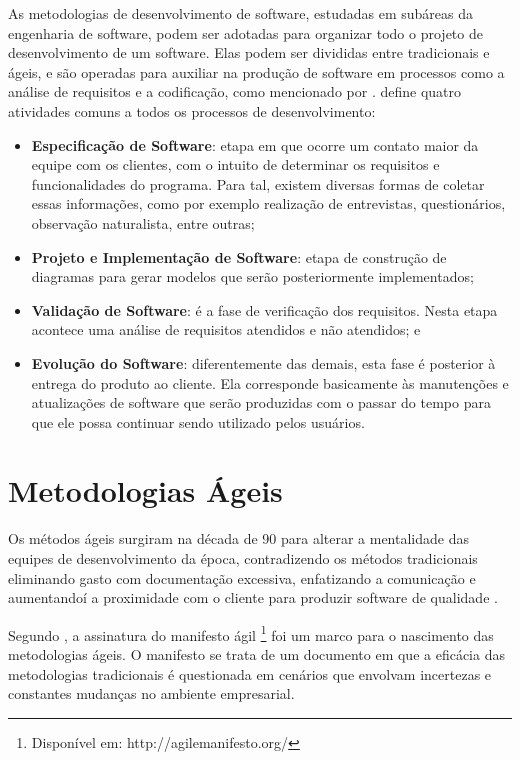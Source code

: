 As metodologias de desenvolvimento de software, estudadas em subáreas da engenharia de software, podem ser adotadas para organizar todo o projeto de desenvolvimento de um software. Elas podem ser divididas entre tradicionais e ágeis, e são operadas para auxiliar na produção de software em processos como a análise de requisitos e a codificação, como mencionado por .  define quatro atividades comuns a todos os processos de desenvolvimento:

\begin{itemize}
 \item \textbf{Especificação de Software}: etapa em que ocorre um contato maior da equipe com os clientes, com o intuito de determinar os requisitos e funcionalidades do programa. Para tal, existem diversas formas de coletar essas informações, como por exemplo realização de entrevistas, questionários, observação naturalista, entre outras;
 \item \textbf{Projeto e Implementação de Software}: etapa de construção de diagramas para gerar modelos que serão posteriormente implementados;
 \item \textbf{Validação de Software}: é a fase de verificação dos requisitos. Nesta etapa acontece uma análise de requisitos atendidos e não atendidos; e
 \item \textbf{Evolução do Software}: diferentemente das demais, esta fase é posterior à entrega do produto ao cliente. Ela corresponde basicamente às manutenções e atualizações de software que serão produzidas com o passar do tempo para que ele possa continuar sendo utilizado pelos usuários.
\end{itemize}

\hspace{2.5cm}

\section{Metodologias Ágeis}
\label{sec:metodologiaagil}
\hspace{2.5cm}

Os métodos ágeis surgiram na década de 90 para alterar a mentalidade das equipes de desenvolvimento da época, contradizendo os métodos tradicionais eliminando gasto com documentação excessiva, enfatizando a comunicação e aumentandoí a proximidade com o cliente para produzir software de qualidade \cite{sato2007uso}.

Segundo , a assinatura do manifesto ágil \footnote{Disponível em: \textsf{http://agilemanifesto.org/}} foi um marco para o nascimento das metodologias ágeis. O manifesto se trata de um documento em que a eficácia das metodologias tradicionais é questionada em cenários que envolvam incertezas e constantes mudanças no ambiente empresarial. 

